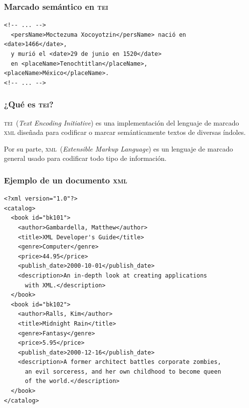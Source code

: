 \documentclass[%
  handout, %
  ]{beamer}
\newcommand*{\rojo}[1]{\textcolor[HTML]{8B0000}{#1}}
\newcommand*{\azul}[1]{\textcolor{bluenivaca}{#1}}
\newcommand*{\TEI}{\textsc{tei}}
\newcommand*{\XML}{\textsc{xml}}
\begin{document}
\begin{frame}[fragile]
  \frametitle{Marcado semántico en \TEI}

  \begin{verbatim}
<!-- ... --> 
  <persName>Moctezuma Xocoyotzin</persName> nació en <date>1466</date>, 
  y murió el <date>29 de junio en 1520</date>
  en <placeName>Tenochtitlan</placeName>, <placeName>México</placeName>.
<!-- ... --> 
\end{verbatim}
  
\end{frame}


\begin{frame}
  \frametitle{¿Qué es \TEI?}

\large\centering
  
\rojo{\TEI\ ({\small\textit{Text Encoding Initiative}})} es una implementación del lenguaje de marcado \azul{\XML} diseñada para codificar o marcar semánticamente textos de diversas índoles.

\bigskip

Por su parte, \azul{\XML\ ({\small\textit{Extensible Markup Language}})} es un lenguaje de marcado general usado para codificar todo tipo de información.
\end{frame}


\begin{frame}[fragile]
  \frametitle{Ejemplo de un documento \XML}
\scriptsize
  \begin{verbatim}
<?xml version="1.0"?>
<catalog>
  <book id="bk101">
    <author>Gambardella, Matthew</author>
    <title>XML Developer's Guide</title>
    <genre>Computer</genre>
    <price>44.95</price>
    <publish_date>2000-10-01</publish_date>
    <description>An in-depth look at creating applications 
      with XML.</description>
  </book>
  <book id="bk102">
    <author>Ralls, Kim</author>
    <title>Midnight Rain</title>
    <genre>Fantasy</genre>
    <price>5.95</price>
    <publish_date>2000-12-16</publish_date>
    <description>A former architect battles corporate zombies, 
      an evil sorceress, and her own childhood to become queen 
      of the world.</description>
  </book>
</catalog>
  \end{verbatim}
\end{frame}
\end{document}
